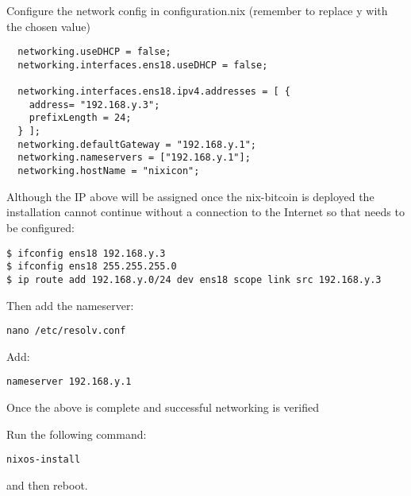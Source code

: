 Configure the network config in configuration.nix (remember to replace y
with the chosen value)

\begin{verbatim}
  networking.useDHCP = false;
  networking.interfaces.ens18.useDHCP = false;

  networking.interfaces.ens18.ipv4.addresses = [ {
    address= "192.168.y.3";
    prefixLength = 24;
  } ];
  networking.defaultGateway = "192.168.y.1";
  networking.nameservers = ["192.168.y.1"];
  networking.hostName = "nixicon";
\end{verbatim}

Although the IP above will be assigned once the nix-bitcoin is deployed
the installation cannot continue without a connection to the Internet so
that needs to be configured:

\begin{verbatim}
$ ifconfig ens18 192.168.y.3
$ ifconfig ens18 255.255.255.0
$ ip route add 192.168.y.0/24 dev ens18 scope link src 192.168.y.3
\end{verbatim}

Then add the nameserver:

\begin{verbatim}
nano /etc/resolv.conf
\end{verbatim}

Add:

\begin{verbatim}
nameserver 192.168.y.1
\end{verbatim}

Once the above is complete and successful networking is verified

Run the following command:

\texttt{nixos-install}

and then reboot.
